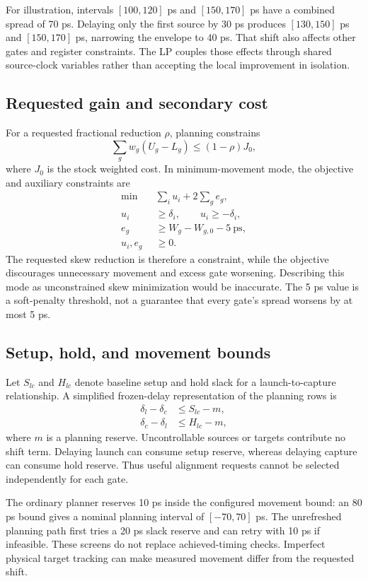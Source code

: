 \documentclass[conference]{IEEEtran}
\begin{document}
For illustration, intervals $[100,120]$ ps and $[150,170]$ ps have a combined spread of 70 ps. Delaying only the first source by 30 ps produces $[130,150]$ ps and $[150,170]$ ps, narrowing the envelope to 40 ps. That shift also affects other gates and register constraints. The LP couples those effects through shared source-clock variables rather than accepting the local improvement in isolation.

\subsection{Requested gain and secondary cost}
For a requested fractional reduction $\rho$, planning constrains
\begin{equation}
\sum_gw_g(U_g-L_g)\le(1-\rho)J_0,
\end{equation}
where $J_0$ is the stock weighted cost. In minimum-movement mode, the objective and auxiliary constraints are
\begin{align}
\min\quad&\sum_i u_i+2\sum_g e_g,\\
u_i&\ge\delta_i,\qquad u_i\ge-\delta_i,\\
e_g&\ge W_g-W_{g,0}-5\ \mathrm{ps},\\
u_i,e_g&\ge0.
\end{align}
The requested skew reduction is therefore a constraint, while the objective discourages unnecessary movement and excess gate worsening. Describing this mode as unconstrained skew minimization would be inaccurate. The 5 ps value is a soft-penalty threshold, not a guarantee that every gate's spread worsens by at most 5 ps.

\subsection{Setup, hold, and movement bounds}
Let $S_{lc}$ and $H_{lc}$ denote baseline setup and hold slack for a launch-to-capture relationship. A simplified frozen-delay representation of the planning rows is
\begin{align}
\delta_l-\delta_c&\le S_{lc}-m,\\
\delta_c-\delta_l&\le H_{lc}-m,
\end{align}
where $m$ is a planning reserve. Uncontrollable sources or targets contribute no shift term. Delaying launch can consume setup reserve, whereas delaying capture can consume hold reserve. Thus useful alignment requests cannot be selected independently for each gate.

The ordinary planner reserves 10 ps inside the configured movement bound: an 80 ps bound gives a nominal planning interval of $[-70,70]$ ps. The unrefreshed planning path first tries a 20 ps slack reserve and can retry with 10 ps if infeasible. These screens do not replace achieved-timing checks. Imperfect physical target tracking can make measured movement differ from the requested shift.
\end{document}
